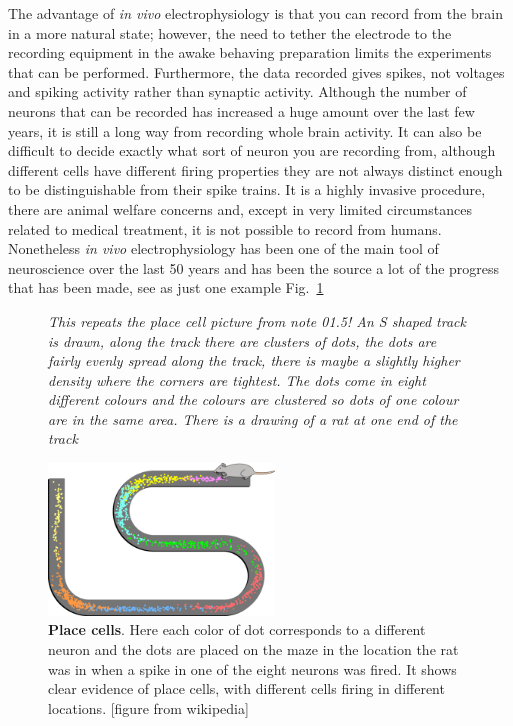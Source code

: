 \documentclass[12pt]{article}
\begin{document}
The advantage of \textsl{in vivo} electrophysiology is that you can
record from the brain in a more natural state; however, the need to
tether the electrode to the recording equipment in the awake behaving
preparation limits the experiments that can be performed. Furthermore,
the data recorded gives spikes, not voltages and spiking activity
rather than synaptic activity. Although the number of neurons that can
be recorded has increased a huge amount over the last few years, it is
still a long way from recording whole brain activity. It can also be
difficult to decide exactly what sort of neuron you are recording
from, although different cells have different firing properties they
are not always distinct enough to be distinguishable from their spike
trains. It is a highly invasive procedure, there are animal welfare
concerns and, except in very limited circumstances related to medical
treatment, it is not possible to record from humans. Nonetheless
\textsl{in vivo} electrophysiology has been one of the main tool of
neuroscience over the last 50 years and has been the source a lot of
the progress that has been made, see as just one example
Fig.~\ref{fig:place}


\begin{figure}
{\textsl{This repeats the place cell picture from note 01.5! An S shaped track is drawn, along the track there are clusters of dots, the dots are fairly evenly spread along the track, there is maybe a slightly higher density where the corners are tightest. The dots come in eight different colours and the colours are clustered so dots of one colour are in the same area. There is a drawing of a rat at one end of the track}}
{
  \begin{center}
  \includegraphics[width=6cm]{place_cells.png}
  \end{center}
  }
  \caption{\textbf{Place cells}. Here each color of dot corresponds to a different neuron and the dots are placed on the maze in the location the rat was in when a spike in one of the eight neurons was fired. It shows clear evidence of place cells, with different cells firing in different locations. [figure from wikipedia]\label{fig:place}}
\end{figure}
\end{document}
